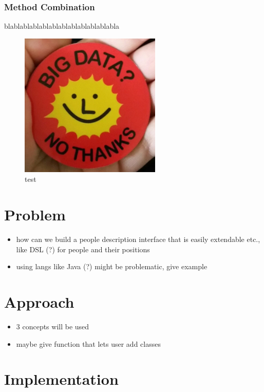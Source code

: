 \documentclass[oribibl]{llncs}
\begin{document}
\subsubsection{Method Combination}
\label{sec:metcom}
blablablablablablablablablablablabla

\begin{figure}[ht]
    \centering
    \includegraphics[width=0.6\textwidth]{images/example.jpg}
    \caption{test}
    \label{fig:computing_primes}
\end{figure}

\section{Problem}
\label{sec:problem}

\begin{itemize}
\item how can we build a people description interface that is easily extendable etc., like DSL (?) for people and their positions
\item using langs like Java (?) might be problematic, give example
\end{itemize}

\section{Approach}
\label{sec:approach}


\begin{itemize}
\item 3 concepts will be used
\item maybe give function that lets user add classes
\end{itemize}


\section{Implementation}
\label{sec:implementation}
\end{document}
